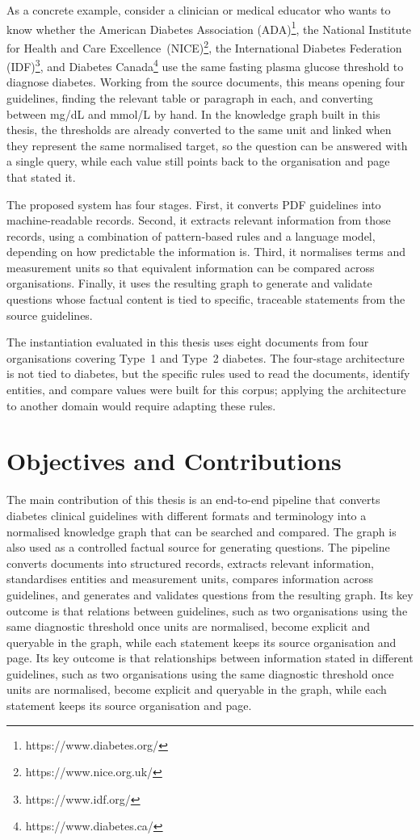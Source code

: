 As a concrete example, consider a clinician or medical educator who wants
to know whether the American Diabetes Association (ADA)\footnote{https://www.diabetes.org/}, the National Institute for Health and
Care Excellence~(NICE)\footnote{https://www.nice.org.uk/}, the International
Diabetes Federation (IDF)\footnote{https://www.idf.org/}, and Diabetes Canada\footnote{https://www.diabetes.ca/} use the same fasting plasma
glucose threshold to diagnose diabetes. Working from the source documents,
this means opening four guidelines, finding the relevant table or
paragraph in each, and converting between mg/dL and mmol/L by hand. In the knowledge graph built in this thesis, the thresholds are already converted to the same unit and linked when they represent the same normalised target, so the question can be answered with a single query, while each value still points back to the organisation and page that stated it.

The proposed system has four stages. First, it converts PDF guidelines into
machine-readable records. Second, it extracts relevant information from
those records, using a combination of pattern-based rules and a language
model, depending on how predictable the information is. Third, it
normalises terms and measurement units so that equivalent information can
be compared across organisations. Finally, it uses the resulting graph to generate and validate questions whose factual content is tied to specific, traceable statements from the source guidelines.

The instantiation evaluated in this thesis uses eight documents from four
organisations covering Type~1 and Type~2 diabetes. The four-stage
architecture is not tied to diabetes, but the specific rules used to read
the documents, identify entities, and compare values were built for this
corpus; applying the architecture to another domain would require adapting
these rules.

\section{Objectives and Contributions}
\label{sec:contributions}

The main contribution of this thesis is an end-to-end pipeline that converts diabetes clinical guidelines with different formats and terminology into a normalised knowledge graph that can be searched and compared. The graph is also used as a controlled factual source for generating questions. The pipeline converts documents into structured records, extracts relevant information, standardises entities and measurement units, compares information across guidelines, and generates and validates questions from the resulting graph. Its key
outcome is that relations between guidelines, such as two organisations
using the same diagnostic threshold once units are normalised, become
explicit and queryable in the graph, while each statement keeps its source
organisation and page. Its key outcome is that relationships between information stated in different guidelines, such as two organisations using the same diagnostic threshold once units are normalised, become explicit and queryable in the graph, while each statement keeps its source organisation and page.

